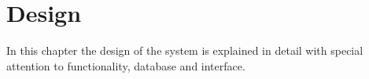 \chapter{Design}

In this chapter the design of the system is explained in detail with special attention to functionality, database and interface.
\clearpage







